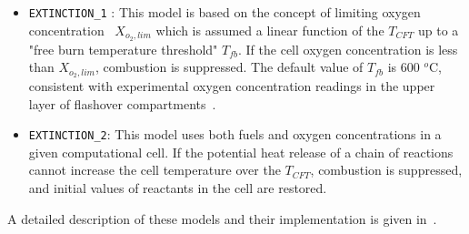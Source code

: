 \documentclass[12pt,letterpaper]{article}
\begin{document}
\begin{flushleft}
\begin{itemize}
    \item \texttt{EXTINCTION\_1} : This model is based on the concept of limiting oxygen concentration~\cite{SFPE:Beyler} $X_{o_2,lim}$ which is assumed a linear function of the $T_{CFT}$ up to a "free burn temperature threshold" $T_{fb}$. If the cell oxygen concentration is less than $X_{o_2,lim}$, combustion is suppressed. The default value of $T_{fb}$ is 600 $^o$C, consistent with experimental oxygen concentration readings in the upper layer of flashover compartments~\cite{Pitts:1995,Bundy:1}. 
    \item \texttt{EXTINCTION\_2}: This model uses both fuels and oxygen concentrations in a given computational cell. If the potential heat release of a chain of reactions cannot increase the cell temperature over the $T_{CFT}$, combustion is suppressed, and initial values of reactants in the cell are restored.
\end{itemize}
A detailed description of these models and their implementation is given in~\cite{FDS_Tech_Guide}. 


\end{flushleft}
\end{document}
